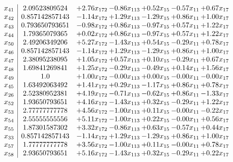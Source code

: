 \documentclass[8pt]{article}
\begin{document}
\[\begin{array}{c| c c@{\hskip 2pt} c@{\hskip 2pt} c@{\hskip 2pt} c@{\hskip 2pt} c@{\hskip 2pt} }
 x_{41}   &  2.09523809524 & +  2.76 x_{172} & -0.86 x_{113} & +  0.52 x_{15} & -0.57 x_{11} & +  0.67 x_{17}\\
 x_{42}   &  0.857142857143 & -1.14 x_{172} & +  1.29 x_{113} & -1.29 x_{15} & +  0.86 x_{11} & +  1.00 x_{17}\\
 x_{43}   &  0.793650793651 & -0.98 x_{172} & +  0.86 x_{113} & -0.97 x_{15} & +  0.57 x_{11} & +  1.22 x_{17}\\
 x_{44}   &  1.79365079365 & +  0.02 x_{172} & +  0.86 x_{113} & -0.97 x_{15} & +  0.57 x_{11} & +  1.22 x_{17}\\
 x_{50}   &  2.49206349206 & +  5.27 x_{172} & -1.43 x_{113} & +  0.54 x_{15} & -0.29 x_{11} & +  0.78 x_{17}\\
 x_{46}   &  0.857142857143 & -1.14 x_{172} & +  1.29 x_{113} & -1.29 x_{15} & +  0.86 x_{11} & +  1.00 x_{17}\\
 x_{47}   &  2.38095238095 & +  1.05 x_{172} & +  0.57 x_{113} & +  0.10 x_{15} & -0.29 x_{11} & +  0.67 x_{17}\\
 x_{48}   &  1.69841269841 & +  1.25 x_{172} & -0.29 x_{113} & -0.49 x_{15} & +  0.14 x_{11} & +  1.56 x_{17}\\
 x_{49}   &  1.0 & +  1.00 x_{172} & -0.00 x_{113} & +  0.00 x_{15} & -0.00 x_{11} & -0.00 x_{17}\\
 x_{45}   &  1.63492063492 & +  1.41 x_{172} & +  0.29 x_{113} & -1.17 x_{15} & +  0.86 x_{11} & +  0.78 x_{17}\\
 x_{26}   &  2.52380952381 & +  4.19 x_{172} & -0.71 x_{113} & -0.62 x_{15} & +  0.86 x_{11} & -1.33 x_{17}\\
 x_{52}   &  1.93650793651 & +  4.16 x_{172} & -1.43 x_{113} & +  0.32 x_{15} & -0.29 x_{11} & +  1.22 x_{17}\\
 x_{53}   &  2.77777777778 & +  4.56 x_{172} & -1.00 x_{113} & +  0.11 x_{15} & -0.00 x_{11} & -0.22 x_{17}\\
 x_{54}   &  2.55555555556 & +  5.11 x_{172} & -1.00 x_{113} & +  0.22 x_{15} & -0.00 x_{11} & +  0.56 x_{17}\\
 x_{55}   &  1.87301587302 & +  3.32 x_{172} & -0.86 x_{113} & +  0.63 x_{15} & -0.57 x_{11} & +  0.44 x_{17}\\
 x_{33}   &  0.857142857143 & -1.14 x_{172} & +  1.29 x_{113} & -1.29 x_{15} & +  0.86 x_{11} & +  1.00 x_{17}\\
 x_{57}   &  1.77777777778 & +  3.56 x_{172} & -1.00 x_{113} & +  0.11 x_{15} & -0.00 x_{11} & +  0.78 x_{17}\\
 x_{58}   &  2.93650793651 & +  5.16 x_{172} & -1.43 x_{113} & +  0.32 x_{15} & -0.29 x_{11} & +  0.22 x_{17}\\

\end{array}\]
\end{document}
